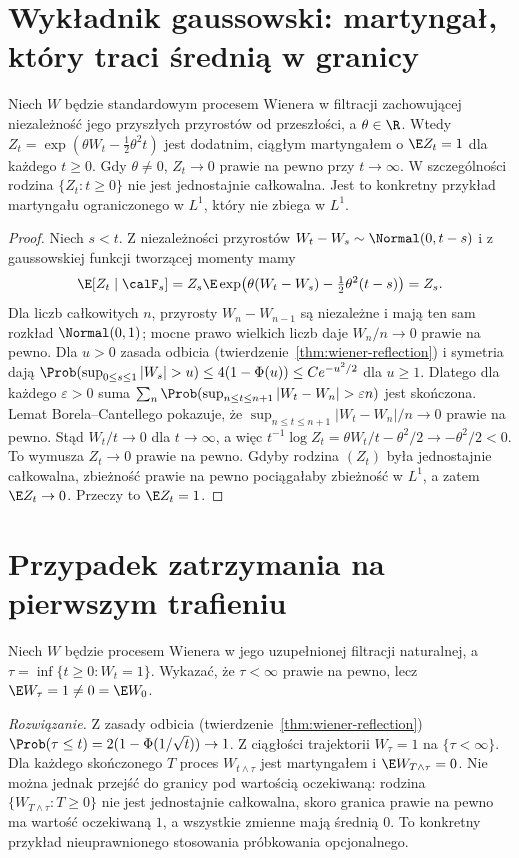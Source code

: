\section{Wykładnik gaussowski: martyngał, który traci średnią w granicy}
\begin{twierdzenie}
\label{thm:brown-exponential-mart}
Niech $W$ będzie standardowym procesem Wienera
w filtracji zachowującej niezależność jego
przyszłych przyrostów od przeszłości, a
$\theta\in\R$. Wtedy
$Z_t=\exp(\theta W_t-\tfrac12\theta^2t)$
jest dodatnim, ciągłym martyngałem o $\E Z_t=1$
dla każdego $t\ge0$. Gdy $\theta\ne0$,
$Z_t\to0$ prawie na pewno przy $t\to\infty$.
W szczególności rodzina $\{Z_t:t\ge0\}$ nie jest
jednostajnie całkowalna. Jest to konkretny przykład
martyngału ograniczonego w $L^1$, który nie zbiega w $L^1$.
\end{twierdzenie}
\begin{proof}
Niech $s<t$. Z niezależności przyrostów
$W_t-W_s\sim\Normal(0,t-s)$ i z gaussowskiej
funkcji tworzącej momenty mamy
\[
\E[Z_t\mid\calF_s]
=Z_s\E\exp\bigl(\theta(W_t-W_s)-\tfrac12\theta^2(t-s)\bigr)
=Z_s.
\]
Dla liczb całkowitych $n$, przyrosty
$W_n-W_{n-1}$ są niezależne i mają ten sam rozkład
$\Normal(0,1)$; mocne prawo wielkich liczb daje
$W_n/n\to0$ prawie na pewno.
Dla $u>0$ zasada odbicia (twierdzenie~\ref{thm:wiener-reflection})
i symetria dają
$\Prob(\sup_{0\le s\le1}|W_s|>u)\le
4(1-\Phi(u))\le C e^{-u^2/2}$ dla $u\ge1$.
Dlatego dla każdego $\varepsilon>0$ suma
$\sum_n\Prob(\sup_{n\le t\le n+1}|W_t-W_n|>\varepsilon n)$
jest skończona. Lemat Borela--Cantellego pokazuje, że
$\sup_{n\le t\le n+1}|W_t-W_n|/n\to0$ prawie na pewno.
Stąd $W_t/t\to0$ dla $t\to\infty$, a więc
$t^{-1}\log Z_t=\theta W_t/t-\theta^2/2\to-\theta^2/2<0$.
To wymusza $Z_t\to0$ prawie na pewno.
Gdyby rodzina $(Z_t)$ była jednostajnie całkowalna,
zbieżność prawie na pewno pociągałaby zbieżność w $L^1$,
a zatem $\E Z_t\to0$. Przeczy to $\E Z_t=1$.
\end{proof}

\section{Przypadek zatrzymania na pierwszym trafieniu}
\begin{zadanie}
Niech $W$ będzie procesem Wienera w jego
uzupełnionej filtracji naturalnej, a
$\tau=\inf\{t\ge0:W_t=1\}$. Wykazać, że
$\tau<\infty$ prawie na pewno, lecz
$\E W_\tau=1\ne0=\E W_0$.

\emph{Rozwiązanie.} Z zasady odbicia (twierdzenie~\ref{thm:wiener-reflection})
$\Prob(\tau\le t)=2(1-\Phi(1/\sqrt t))\to1$.
Z ciągłości trajektorii $W_\tau=1$ na $\{\tau<\infty\}$.
Dla każdego skończonego $T$ proces $W_{t\wedge\tau}$
jest martyngałem i $\E W_{T\wedge\tau}=0$.
Nie można jednak przejść do granicy pod wartością oczekiwaną:
rodzina $\{W_{T\wedge\tau}:T\ge0\}$ nie jest
jednostajnie całkowalna, skoro granica prawie na pewno
ma wartość oczekiwaną $1$, a wszystkie zmienne mają
średnią $0$. To konkretny przykład nieuprawnionego
stosowania próbkowania opcjonalnego.
\end{zadanie}


